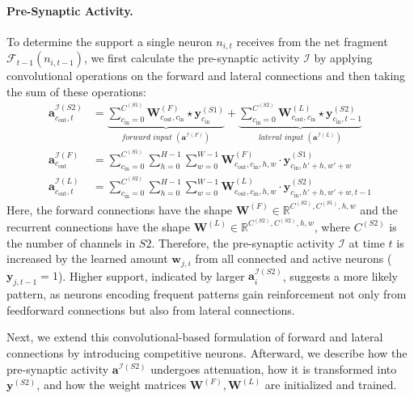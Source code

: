 \documentclass[12pt]{article}
\begin{document}
\paragraph{Pre-Synaptic Activity.}
To determine the support a single neuron $n_{i,t}$ receives from the net fragment $\mathcal{F}_{t-1}(n_{i, t-1})$, we first calculate the pre-synaptic activity $\mathcal{I}$ by applying convolutional operations on the forward and lateral connections and then taking the sum of these operations: 
%
\begin{equation}
\begin{aligned}
\boldsymbol{a}^{\mathcal{I}(S2)}_{c_{\text{out}}, t}
&= \underbrace{
    \sum_{c_\text{in}=0}^{C^{(S1)}} \boldsymbol{W}^{(F)}_{c_{\text{out}}, c_{\text{in}}} 
    \star \boldsymbol{y}_{c_{\text{in}}}^{(S1)}
}_{\textit{forward input } (\boldsymbol{a}^{\mathcal{I}(F)})}
+ 
\underbrace{
    \sum_{c_\text{in}=0}^{C^{(S2)}} \boldsymbol{W}^{(L)}_{c_{\text{out}}, c_{\text{in}}} 
    \star \boldsymbol{y}_{c_{\text{in}}, t-1}^{(S2)}
}_{\textit{lateral input } (\boldsymbol{a}^{\mathcal{I}(L)})}
\\[1.5ex]
\boldsymbol{a}^{\mathcal{I}(F)}_{c_{\text{out}}}
&= \sum_{c_\text{in}=0}^{C^{(S1)}} \sum_{h=0}^{H-1} \sum_{w=0}^{W-1} 
  \boldsymbol{W}^{(F)}_{c_{\text{out}}, c_{\text{in}}, h, w} \cdot 
  \boldsymbol{y}^{(S1)}_{c_{\text{in}}, h'+h, w'+w}
\\
\boldsymbol{a}^{\mathcal{I}(L)}_{c_{\text{out}}, t}
&= \sum_{c_\text{in}=0}^{C^{(S2)}} \sum_{h=0}^{H-1} \sum_{w=0}^{W-1} 
  \boldsymbol{W}^{(L)}_{c_{\text{out}}, c_{\text{in}}, h, w} \cdot 
  \boldsymbol{y}^{(S2)}_{c_{\text{in}}, h'+h, w'+w, t-1}
\end{aligned}
\label{eq:a_a2}
\end{equation}
%
Here, the forward connections have the shape $\boldsymbol{W}^{(F)} \in \mathbb{R}^{C^{(S2)}, C^{(S1)}, h, w}$ and the recurrent connections have the shape $\boldsymbol{W}^{(L)} \in \mathbb{R}^{C^{(S2)}, C^{(S2)}, h, w}$, where $C^{(S2)}$ is the number of channels in $S2$. 
Therefore, the pre-synaptic activity $\mathcal{I}$ at time $t$ is increased by the learned amount $\boldsymbol{w}_{j,i}$ from all connected and active neurons ($\boldsymbol{y}_{j,t-1} = 1$).
%
Higher support, indicated by larger $\boldsymbol{a}^{\mathcal{I}(S2)}_{i}$, suggests a more likely pattern, as neurons encoding frequent patterns gain reinforcement not only from feedforward connections but also from lateral connections.

Next, we extend this convolutional-based formulation of forward and lateral connections by introducing competitive neurons.
Afterward, we describe how the pre-synaptic activity $\boldsymbol{a}^{\mathcal{I}(S2)}$ undergoes attenuation, how it is transformed into $\boldsymbol{y}^{(S2)}$,
and how the weight matrices $\boldsymbol{W}^{(F)}, \boldsymbol{W}^{(L)}$ are initialized and trained.
\end{document}
